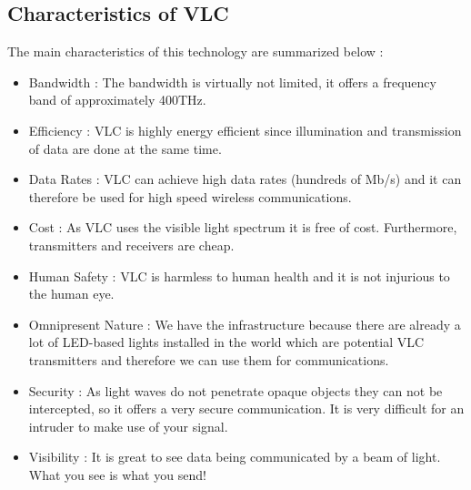 \pagebreak

\subsection {Characteristics of VLC}

The main characteristics of this technology are summarized below \cite{r1}:
\begin{itemize}
  \item Bandwidth :
The bandwidth is virtually not limited, it offers a frequency band of  approximately 400THz.
  \item Efficiency :
VLC is highly energy efficient since illumination and transmission of data are done at the same time.
  \item Data Rates :
VLC can achieve high data rates (hundreds of Mb/s) and it can therefore be used for high speed wireless communications.
  \item Cost :
As VLC uses the visible light spectrum it is free of cost. Furthermore, transmitters and receivers are cheap.
  \item Human Safety :
VLC is harmless to human health and it is not injurious to the human eye.
  \item Omnipresent Nature :
We have the infrastructure because there are already a lot of LED-based lights installed in the world which are potential VLC transmitters and therefore we can use them for communications.
  \item Security :
As light waves do not penetrate opaque objects they can not  be intercepted, so it offers a very secure communication. It is very difficult for an intruder to make use of your signal.
  \item Visibility :
It is great to see data being communicated by a beam of light. What you see is what you send!
\end{itemize}

%


